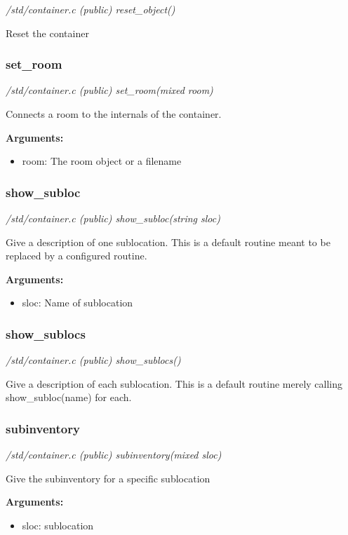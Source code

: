 {\em /std/container.c (public) reset\_object()}

Reset the container 


\subsubsection{set\_room}

{\em /std/container.c (public) set\_room(mixed room)}

Connects a room to the internals of the container.

{\bf Arguments:}
\begin{itemize}
\item     room: The room object or a filename
\end{itemize}


\subsubsection{show\_subloc}

{\em /std/container.c (public) show\_subloc(string sloc)}

Give a description of one sublocation. This is a default
routine meant to be replaced by a configured routine.

{\bf Arguments:}
\begin{itemize}
\item      sloc: Name of sublocation
\end{itemize}


\subsubsection{show\_sublocs}

{\em /std/container.c (public) show\_sublocs()}

Give a description of each sublocation. This is a default
routine merely calling show\_subloc(name) for each.


\subsubsection{subinventory}

{\em /std/container.c (public) subinventory(mixed sloc)}

Give the subinventory for a specific sublocation

{\bf Arguments:}
\begin{itemize}
\item      sloc: sublocation
\end{itemize}


